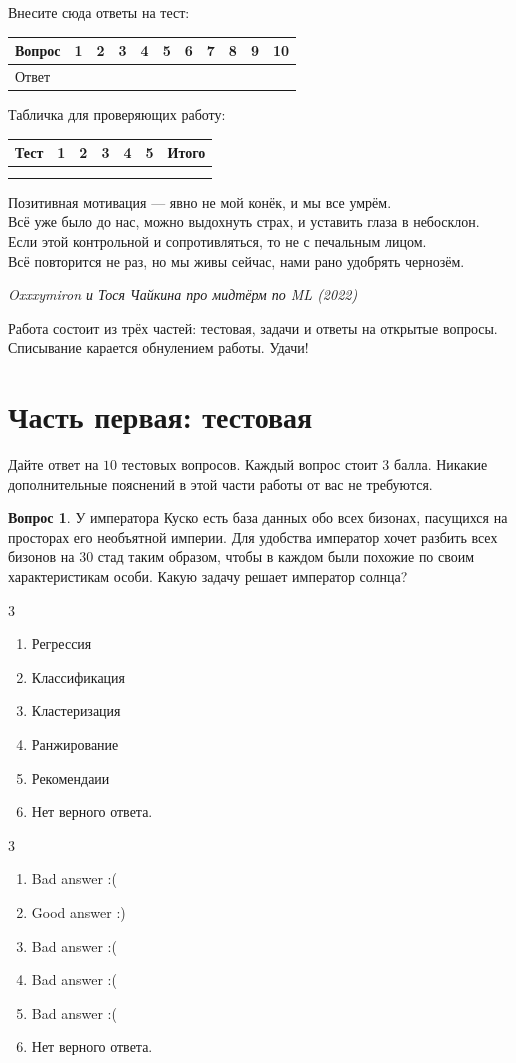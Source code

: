 \documentclass[12pt]{article}
\def \putyourname{\fbox{
    \begin{minipage}{42em}
      Фамилия, имя, номер группы:\vspace*{3ex}\par
      \noindent\dotfill\vspace{2mm}
    \end{minipage}
  }
}
\def \checktable{

  \vspace{5pt}
  Табличка для проверяющих работу:

\vspace{5pt}

  \begin{tabular}{|m{2cm}|m{1cm}|m{1cm}|m{1cm}|m{1cm}|m{1cm}|m{2cm}|}
\toprule
    Тест & 1 &  2 & 3 & 4 & 5 & Итого \\
\midrule
    &  &  & & & & \\
    &  &  & & & & \\
 \bottomrule
\end{tabular}
}
\def \testtable{

\vspace{5pt}
  Внесите сюда ответы на тест:

\vspace{5pt}

\begin{tabular}{|m{2cm}|m{0.6cm}|m{0.6cm}|m{0.6cm}|m{0.6cm}|m{0.6cm}|m{0.6cm}|m{0.6cm}|m{0.6cm}|m{0.6cm}|m{0.6cm}|}
\toprule
    Вопрос & 1 &  2 & 3 & 4 & 5 & 6 & 7 & 8 & 9 & 10 \\
\midrule
    Ответ &  &  & & & & & & & & \\
 \bottomrule
\end{tabular}
}
\newenvironment{answerlist}[1][3]{
\begin{multicols}{#1}

\begin{enumerate}[label=\fbox{\emph{\Alph*}},ref=\emph{\alph*}]
}
{
\item Нет верного ответа.
\end{enumerate}
\end{multicols}
}
\theoremstyle{definition}
\newtheorem{question}{Вопрос}
\begin{document}
\putyourname

\testtable

\checktable

\epigraph{Позитивная мотивация — явно не мой конёк, и мы все умрём. \\ Всё уже было до нас, можно выдохнуть страх, и уставить глаза в небосклон. \\ Если этой контрольной и сопротивляться, то не с печальным лицом. \\ Всё повторится не раз, но мы живы сейчас, нами рано удобрять чернозём.}{\textit{Oxxxymiron и Тося Чайкина про мидтёрм по ML (2022)}}


Работа состоит из трёх частей: тестовая, задачи и ответы на открытые вопросы. Списывание карается обнулением работы. Удачи!


\section*{Часть первая: тестовая} 

Дайте ответ на $10$ тестовых вопросов. Каждый вопрос стоит $3$ балла. Никакие дополнительные пояснений в этой части работы от вас не требуются.

\begin{question}
У императора Куско есть база данных обо всех бизонах, пасущихся на просторах его необъятной империи. Для удобства император хочет разбить всех бизонов на $30$ стад таким образом, чтобы в каждом были похожие по своим характеристикам особи. Какую задачу решает император солнца? 
\begin{answerlist}
   \item  Регрессия
   \item  Классификация
   \item  Кластеризация
   \item  Ранжирование
   \item  Рекомендаии
\end{answerlist}
\end{question}

\begin{solution}
\begin{answerlist}
  \item Bad answer :(
  \item Good answer :)
  \item Bad answer :(
  \item Bad answer :(
  \item Bad answer :(
\end{answerlist}
\end{solution}
\end{document}

